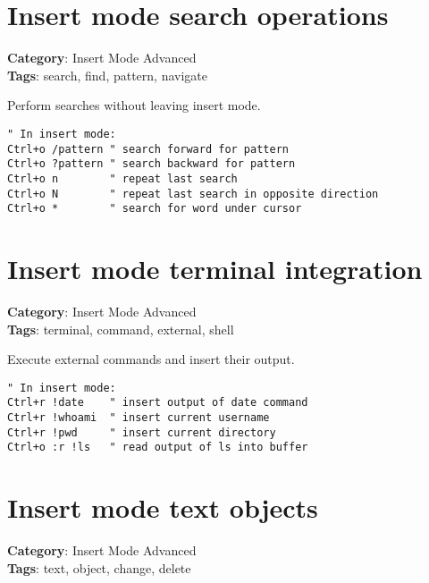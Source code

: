 {{{{{\section{Insert mode search operations}

\textbf{Category}: Insert Mode Advanced\\ \textbf{Tags}: search, find, pattern, navigate
\vspace{0.5cm}

Perform searches without leaving insert mode.

\begin{Exa*}{}
\begin{Verbatim}[fontsize=\footnotesize, breaklines, breakanywhere]
" In insert mode:
Ctrl+o /pattern " search forward for pattern
Ctrl+o ?pattern " search backward for pattern
Ctrl+o n        " repeat last search
Ctrl+o N        " repeat last search in opposite direction
Ctrl+o *        " search for word under cursor
\end{Verbatim}
\end{Exa*}

\section{Insert mode terminal integration}

\textbf{Category}: Insert Mode Advanced\\ \textbf{Tags}: terminal, command, external, shell
\vspace{0.5cm}

Execute external commands and insert their output.

\begin{Exa*}{}
\begin{Verbatim}[fontsize=\footnotesize, breaklines, breakanywhere]
" In insert mode:
Ctrl+r !date    " insert output of date command
Ctrl+r !whoami  " insert current username
Ctrl+r !pwd     " insert current directory
Ctrl+o :r !ls   " read output of ls into buffer
\end{Verbatim}
\end{Exa*}

\section{Insert mode text objects}

\textbf{Category}: Insert Mode Advanced\\ \textbf{Tags}: text, object, change, delete
\vspace{0.5cm}

}}}}}
